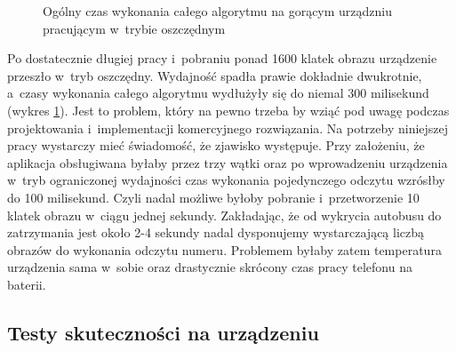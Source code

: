 \begin{figure}[h!]
	\begin{center}
	\end{center}
	\caption{Ogólny czas wykonania całego algorytmu na gorącym urządzniu
		pracującym w~trybie oszczędnym}
	\label{chart:whole_alg_ms_time_hot}
\end{figure}

Po dostatecznie długiej pracy i~pobraniu ponad 1600 klatek obrazu urządzenie
przeszło w~tryb oszczędny. Wydajność spadła prawie dokładnie dwukrotnie,
a~czasy wykonania całego algorytmu wydłużyły się do niemal 300 milisekund
(wykres \ref{chart:whole_alg_ms_time_hot}). Jest to problem, który
na pewno trzeba by wziąć pod uwagę podczas projektowania
i~implementacji komercyjnego rozwiązania.
Na potrzeby niniejszej pracy wystarczy mieć świadomość, że zjawisko
występuje. Przy założeniu, że aplikacja obsługiwana byłaby przez 
trzy wątki oraz po wprowadzeniu urządzenia w~tryb ograniczonej wydajności
czas wykonania pojedynczego odczytu wzrósłby do 100 milisekund. Czyli nadal
możliwe byłoby pobranie i~przetworzenie 10 klatek obrazu w~ciągu jednej sekundy.
Zakładając, że od wykrycia autobusu do zatrzymania jest około 2-4 sekundy 
nadal dysponujemy wystarczającą liczbą obrazów do wykonania odczytu numeru.
Problemem byłaby zatem temperatura urządzenia sama w~sobie oraz
drastycznie skrócony czas pracy telefonu na baterii.
	
\subsection{Testy skuteczności na urządzeniu}

